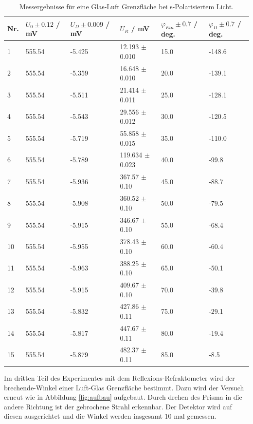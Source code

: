 \documentclass[12pt,a4paper,twoside]{article}
\begin{document}
\begin{table}[H]
    \centering
    \caption{Messergebnisse für eine Glas-Luft Grenzfläche bei s-Polarisiertem Licht. }
    \label{tab:mess glas luft s-pol}
    \begin{tabular}{| l | l | l | l | l | l |}
        \hline
        Nr. & $U_0 \pm 0.12 $ / mV & $U_D \pm 0.009$ / mV & $U_{R}$ / mV & $\varphi_{Ein} \pm 0.7$ / deg. & $\varphi_D \pm 0.7$ / deg.  \\
        \hline
        1  & 555.54 & -5.425 & 12.193  $\pm$ 0.010 & 15.0  & -148.6 \\
        2  & 555.54 & -5.359 & 16.648  $\pm$ 0.010 & 20.0  & -139.1 \\
        3  & 555.54 & -5.511 & 21.414  $\pm$ 0.011 & 25.0  & -128.1 \\
        4  & 555.54 & -5.543 & 29.556  $\pm$ 0.012 & 30.0  & -120.5 \\
        5  & 555.54 & -5.719 & 55.858  $\pm$ 0.015 & 35.0  & -110.0 \\
        6  & 555.54 & -5.789 & 119.634 $\pm$ 0.023 & 40.0  & -99.8  \\
        7  & 555.54 & -5.936 & 367.57  $\pm$ 0.10  & 45.0  & -88.7  \\
        8  & 555.54 & -5.908 & 360.52  $\pm$ 0.10  & 50.0  & -79.5  \\
        9  & 555.54 & -5.915 & 346.67  $\pm$ 0.10  & 55.0  & -68.4  \\
        10 & 555.54 & -5.955 & 378.43  $\pm$ 0.10  & 60.0  & -60.4  \\
        11 & 555.54 & -5.963 & 388.25  $\pm$ 0.10  & 65.0 & -50.1  \\
        12 & 555.54 & -5.915 & 409.67  $\pm$ 0.10  & 70.0 & -39.8  \\
        13 & 555.54 & -5.832 & 427.86  $\pm$ 0.11  & 75.0 & -29.1  \\
        14 & 555.54 & -5.817 & 447.67  $\pm$ 0.11  & 80.0 & -19.4  \\
        15 & 555.54 & -5.879 & 482.37  $\pm$ 0.11  & 85.0 & -8.5   \\
        \hline
    \end{tabular}
\end{table}

\noindent
Im dritten Teil des Experimentes mit dem Reflexions-Refraktometer wird der brechende-Winkel einer Luft-Glas Grenzfläche bestimmt. 
Dazu wird der Versuch erneut wie in Abbildung \ref{fig:aufbau} aufgebaut. Durch drehen des Prisma in die andere Richtung ist der gebrochene Strahl erkennbar. 
Der Detektor wird auf diesen ausgerichtet und die Winkel werden insgesamt 10 mal gemessen. 
\end{document}
